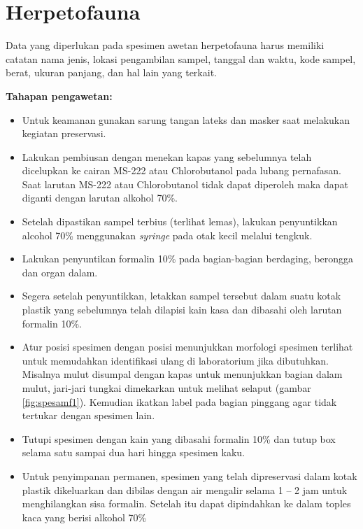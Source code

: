 \documentclass[
]{book}
\providecommand{\tightlist}{%
  \setlength{\itemsep}{0pt}\setlength{\parskip}{0pt}}
\begin{document}
\hypertarget{herpetofauna-1}{%
\section*{Herpetofauna}\label{herpetofauna-1}}

Data yang diperlukan pada spesimen awetan herpetofauna harus memiliki catatan nama jenis, lokasi pengambilan sampel, tanggal dan waktu, kode sampel, berat, ukuran panjang, dan hal lain yang terkait.

\textbf{Tahapan pengawetan:}

\begin{itemize}
\tightlist
\item
  Untuk keamanan gunakan sarung tangan lateks dan masker saat melakukan kegiatan preservasi.
\item
  Lakukan pembiusan dengan menekan kapas yang sebelumnya telah dicelupkan ke cairan MS-222 atau Chlorobutanol pada lubang pernafasan. Saat larutan MS-222 atau Chlorobutanol tidak dapat diperoleh maka dapat diganti dengan larutan alkohol 70\%.
\item
  Setelah dipastikan sampel terbius (terlihat lemas), lakukan penyuntikkan alcohol 70\% menggunakan \emph{syringe} pada otak kecil melalui tengkuk.
\item
  Lakukan penyuntikan formalin 10\% pada bagian-bagian berdaging, berongga dan organ dalam.
\item
  Segera setelah penyuntikkan, letakkan sampel tersebut dalam suatu kotak plastik yang sebelumnya telah dilapisi kain kasa dan dibasahi oleh larutan formalin 10\%.
\item
  Atur posisi spesimen dengan posisi menunjukkan morfologi spesimen terlihat untuk memudahkan identifikasi ulang di laboratorium jika dibutuhkan. Misalnya mulut disumpal dengan kapas untuk menunjukkan bagian dalam mulut, jari-jari tungkai dimekarkan untuk melihat selaput (gambar \ref{fig:spesamf1}). Kemudian ikatkan label pada bagian pinggang agar tidak tertukar dengan spesimen lain.
\item
  Tutupi spesimen dengan kain yang dibasahi formalin 10\% dan tutup box selama satu sampai dua hari hingga spesimen kaku.
\item
  Untuk penyimpanan permanen, spesimen yang telah dipreservasi dalam kotak plastik dikeluarkan dan dibilas dengan air mengalir selama 1 -- 2 jam untuk menghilangkan sisa formalin. Setelah itu dapat dipindahkan ke dalam toples kaca yang berisi alkohol 70\%
\end{itemize}
\end{document}
